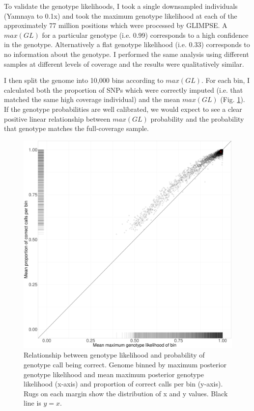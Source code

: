 To validate the genotype likelihoods, I took a single downsampled individuals (Yamnaya to 0.1x) and took the maximum genotype likelihood at each of the approximately 77 million positions which were processed by GLIMPSE. A $max(GL)$ for a particular genotype (i.e. 0.99) corresponds to a high confidence in the genotype. Alternatively a flat genotype likelihood (i.e. 0.33) corresponds to no information about the genotype. I performed the same analysis using different samples at different levels of coverage and the results were qualitatively similar. 

I then split the genome into 10,000 bins according to $max(GL)$. For each bin, I calculated both the proportion of SNPs which were correctly imputed (i.e. that matched the same high coverage individual) and the mean $max(GL)$ (Fig. \ref{fig:Yamnaya_0.1x_GL_calibration}). If the genotype probabilities are well calibrated, we would expect to see a clear positive linear relationship between $max(GL)$ probability and the probability that genotype matches the full-coverage sample.  

\begin{figure}[htp]
    \centering
    \includegraphics[width=1.0\textwidth]{../images/chapter1/Yamnaya_0.1x_bin.pdf}
    \caption{Relationship between genotype likelihood and probability of genotype call being correct. Genome binned by maximum posterior genotype likelihood and mean maximum posterior genotype likelihood (x-axis) and proportion of correct calls per bin (y-axis). Rugs on each margin show the distribution of x and y values. Black line is $y=x$.}
    \label{fig:Yamnaya_0.1x_GL_calibration}
\end{figure}

